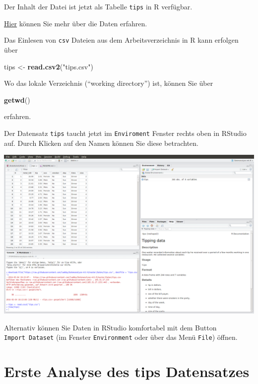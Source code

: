 \documentclass[12pt,ngerman,paper=a4,pagesize,DIV=13]{scrreprt}
\newenvironment{Shaded}{\begin{snugshade}}{\end{snugshade}}
\newcommand{\KeywordTok}[1]{\textcolor[rgb]{0.13,0.29,0.53}{\textbf{#1}}}
\newcommand{\NormalTok}[1]{#1}
\newcommand{\StringTok}[1]{\textcolor[rgb]{0.31,0.60,0.02}{#1}}
\begin{document}
Der Inhalt der Datei ist jetzt als Tabelle \texttt{tips} in R verfügbar.

\href{https://github.com/luebby/Datenanalyse-mit-R/blob/master/Daten/tips-help.pdf}{Hier}
können Sie mehr über die Daten erfahren.

Das Einlesen von \texttt{csv} Dateien aus dem Arbeitsverzeichnis in R
kann erfolgen über

\begin{Shaded}
\begin{Highlighting}[]
\NormalTok{tips <-}\StringTok{ }\KeywordTok{read.csv2}\NormalTok{(}\StringTok{"tips.csv"}\NormalTok{)}
\end{Highlighting}
\end{Shaded}

Wo das lokale Verzeichnis (\enquote{working directory}) ist, können Sie
über

\begin{Shaded}
\begin{Highlighting}[]
\KeywordTok{getwd}\NormalTok{()}
\end{Highlighting}
\end{Shaded}

erfahren.

Der Datensatz \texttt{tips} taucht jetzt im \texttt{Enviroment} Fenster
rechts oben in RStudio auf. Durch Klicken auf den Namen können Sie diese
betrachten.

\begin{center}\includegraphics[width=0.8\linewidth]{Inhalte/images/tips-Enviroment} \end{center}

Alternativ können Sie Daten in RStudio komfortabel mit dem Button
\texttt{Import\ Dataset} (im Fenster \texttt{Environment} oder über das
Menü \texttt{File}) öffnen.

\hypertarget{erste-analyse-des-tips-datensatzes}{%
\section{Erste Analyse des tips
Datensatzes}\label{erste-analyse-des-tips-datensatzes}}
\end{document}
